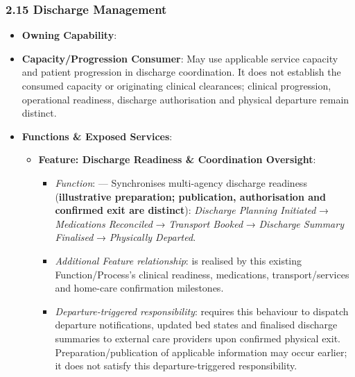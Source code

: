 \par\smallskip
{}\label{rad:hso:274}
\subsubsection*{2.15 Discharge Management}
\label{rad:hso:275}

\begin{itemize}

\item
\textbf{Owning Capability}: \texttt{}



\item
\textbf{Capacity/\allowbreak{}Progression Consumer}: May use applicable service capacity and patient progression in discharge coordination. It does not establish the consumed capacity or originating clinical clearances; clinical progression, operational readiness, discharge authorisation and physical departure remain distinct.



\item
\textbf{Functions \& Exposed Services}:


\begin{itemize}

\item
\textbf{Feature: Discharge Readiness \& Coordination Oversight}:


\begin{itemize}

\item
\emph{Function}: \texttt{} — Synchronises multi-agency discharge readiness (\textbf{illustrative preparation; publication, authorisation and confirmed exit are distinct}): \emph{Discharge Planning Initiated} → \emph{Medications Reconciled} → \emph{Transport Booked} → \emph{Discharge Summary Finalised} → \emph{Physically Departed}.



\item
\emph{Additional Feature relationship}: \texttt{} is realised by this existing Function/\allowbreak{}Process's clinical readiness, medications, transport/\allowbreak{}services and home-care confirmation milestones.



\item
\emph{Departure-triggered responsibility}: \texttt{} requires this behaviour to dispatch departure notifications, updated bed states and finalised discharge summaries to external care providers upon confirmed physical exit. Preparation/\allowbreak{}publication of applicable information may occur earlier; it does not satisfy this departure-triggered responsibility.




\end{itemize}
\end{itemize}
\end{itemize}
